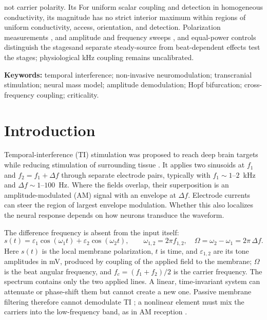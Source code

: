 \documentclass[11pt,a4paper]{article}
\providecommand{\DIFaddtex}[1]{{\protect\color{blue} \sf #1}} %
\providecommand{\DIFdeltex}[1]{{\protect\color{red} \scriptsize #1}} %
\providecommand{\DIFaddbegin}{} %
\providecommand{\DIFaddend}{} %
\providecommand{\DIFdelbegin}{} %
\providecommand{\DIFdelend}{} %
\providecommand{\DIFadd}[1]{\texorpdfstring{\DIFaddtex{#1}}{#1}} %
\providecommand{\DIFdel}[1]{\texorpdfstring{\DIFdeltex{#1}}{}} %
\begin{document}
not carrier polarity. \DIFdelbegin \DIFdel{Its }\DIFdelend \DIFaddbegin \DIFadd{For uniform scalar coupling and detection in homogeneous
conductivity, its }\DIFaddend magnitude has no strict interior maximum\DIFdelbegin \DIFdel{within regions of uniform
conductivity, access, orientation, and detection}\DIFdelend . Polarization measurements \DIFdelbegin \DIFdel{, }\DIFdelend \DIFaddbegin \DIFadd{and }\DIFaddend amplitude and frequency sweeps \DIFdelbegin \DIFdel{, and equal-power controls distinguish the
stagesand separate
steady-source from beat-dependent effects}\DIFdelend \DIFaddbegin \DIFadd{test the
stages; physiological kHz coupling remains uncalibrated}\DIFaddend .
\fi

\smallskip
\noindent\textbf{Keywords:} temporal interference; non-invasive neuromodulation;
transcranial stimulation; neural mass model; amplitude demodulation; Hopf bifurcation;
cross-frequency coupling; criticality.

\clearpage
\tableofcontents
\clearpage

\section{Introduction}
Temporal-interference (TI) stimulation was proposed to reach deep brain targets while
reducing stimulation of surrounding tissue \cite{grossman2017}. It applies two sinusoids at
$f_1$ and $f_2=f_1+\Delta f$ through separate electrode pairs, typically with
$f_1\sim1$--$2$~kHz and $\Delta f\sim1$--$100$~Hz. Where the fields overlap, their
superposition is an amplitude-modulated (AM) signal with an envelope at $\Delta f$.
Electrode currents can steer the region of largest envelope modulation. Whether this
also localizes the neural response depends on how neurons transduce the waveform.

The difference frequency is absent from the input itself:
\begin{equation}
s(t)=\varepsilon_1\cos(\omega_1 t)+\varepsilon_2\cos(\omega_2 t),\qquad
\omega_{1,2}=2\pi f_{1,2},\quad \Omega=\omega_2-\omega_1=2\pi\,\Delta f .
\label{eq:am}
\end{equation}
Here $s(t)$ is the local membrane polarization, $t$ is time, and
$\varepsilon_{1,2}$ are its tone amplitudes in mV, produced by coupling of the applied field to the membrane; $\Omega$ is the beat angular frequency, and
$f_c=(f_1+f_2)/2$ is the carrier frequency. The spectrum contains only the two applied lines. A linear, time-invariant system can attenuate or phase-shift
them but cannot create a new one. Passive membrane filtering therefore cannot
demodulate TI \cite{mirzakhalili2020}; a nonlinear element must mix the carriers into
the low-frequency band, as in AM reception \cite{nahin2001}.
\end{document}

